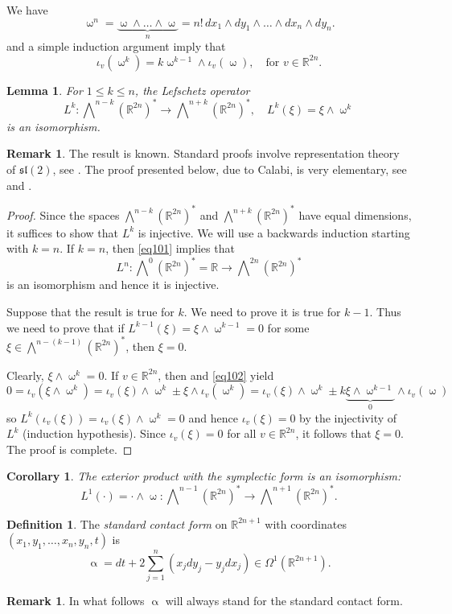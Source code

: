 \documentclass[intlimits,12pt,reqno]{amsart}
\newcommand{\R}{\mathbb R}
\numberwithin{equation}{section}
\newtheorem{lemma}[theorem]{Lemma}
\newtheorem{corollary}[theorem]{Corollary}
\theoremstyle{definition}
\newtheorem{remark}[theorem]{Remark}
\newtheorem{definition}[theorem]{Definition}
\newcommand{\Ep}{\bigwedge\nolimits}
\begin{document}
We have
\begin{equation}
\label{eq101}
\upomega^n=\underbrace{\upomega\wedge\ldots\wedge\upomega}_n=n!\, dx_1\wedge dy_1\wedge\ldots\wedge dx_n\wedge dy_n.
\end{equation}
 and a simple induction argument imply that
\begin{equation}
\label{eq102}
\iota_v(\upomega^k)=k\upomega^{k-1}\wedge\iota_v(\upomega),
\quad
\text{for $v\in\R^{2n}$.}
\end{equation}
\begin{lemma}
\label{T22}
For $1\leq k\leq n$, the {\em Lefschetz operator}
$$
L^k:\Ep^{n-k}(\R^{2n})^*\to \Ep^{n+k}(\R^{2n})^*,
\quad
L^k(\xi)=\xi\wedge\upomega^k
$$
is an isomorphism.
\end{lemma}
\begin{remark}
\label{R1}
The result is known. Standard proofs involve representation theory of $\mathfrak{sl}(2)$, see \cite[Proposition~1.2.30]{huybrechts}. The proof presented below, due to Calabi, is very elementary, see \cite[Proposition~1.1a]{Bryant} and \cite{mathoverflow1}.
\end{remark}
\begin{proof}
Since the spaces $\Ep^{n-k}(\R^{2n})^*$ and $\Ep^{n+k}(\R^{2n})^*$ have equal dimensions, it suffices to show that $L^k$ is injective. We will use a backwards induction starting with $k=n$. If $k=n$, then \eqref{eq101} implies that
$$
L^n:\Ep^0(\R^{2n})^*=\R\to \Ep^{2n}(\R^{2n})^*
$$
is an isomorphism and hence it is injective. 

Suppose that the result is true for $k$. We need to prove it is true for $k-1$. Thus 
we need to prove that if
$L^{k-1}(\xi)=\xi\wedge\upomega^{k-1}=0$ for some
$\xi\in\Ep^{n-(k-1)}(\R^{2n})^*$, then $\xi=0$.

Clearly, $\xi\wedge\upomega^k=0$. If $v\in\R^{2n}$, then  and \eqref{eq102} yield
$$
0=\iota_v(\xi\wedge\upomega^k)=
\iota_v(\xi)\wedge\upomega^k\pm \xi\wedge\iota_v(\upomega^k)=
\iota_v(\xi)\wedge\upomega^k\pm k\underbrace{\xi\wedge\upomega^{k-1}}_{0}\wedge\iota_v(\upomega)
$$
so $L^k(\iota_v(\xi))=\iota_v(\xi)\wedge\upomega^k=0$ and hence $\iota_v(\xi)=0$ by the injectivity of $L^k$ (induction hypothesis).
Since $\iota_v(\xi)=0$ for all $v\in\R^{2n}$, it follows that $\xi=0$. The proof is complete.
\end{proof}

\begin{corollary}
\label{T23}
The exterior product with the symplectic form is an isomorphism:
$$
L^1(\cdot)=
\cdot\wedge\upomega:\Ep^{n-1}(\R^{2n})^*\to\Ep^{n+1}(\R^{2n})^*.
$$
\end{corollary}
\begin{definition}
\label{def:alpha}
The {\em standard contact form} on $\R^{2n+1}$ with coordinates $(x_1,y_1,\ldots,x_n,y_n,t)$ is
$$
\upalpha=dt+2\sum_{j=1}^n(x_jdy_j-y_jdx_j)\in \Omega^1(\R^{2n+1}).
$$
\end{definition}
\begin{remark}
In what follows $\upalpha$ will always stand for the standard contact form.
\end{remark}
\end{document}
